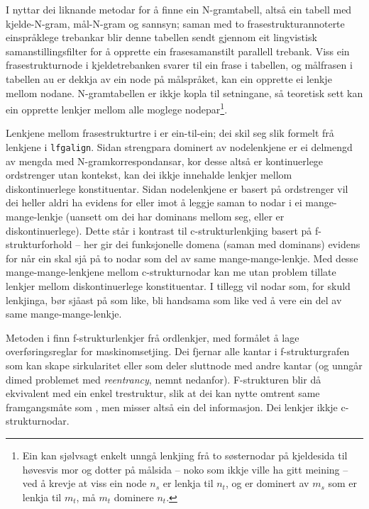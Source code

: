\documentclass[11pt,a4paper,oneside,draft]{book}
\begin{document}
 I \citet{samuelsson2007apa} nyttar dei liknande metodar for å finne
 ein N-gramtabell, altså ein tabell med kjelde-N-gram, mål-N-gram og
 sannsyn; saman med to frasestrukturannoterte einspråklege trebankar
 blir denne tabellen sendt gjennom eit lingvistisk
 samanstillingsfilter for å opprette ein frasesamanstilt parallell
 trebank. Viss ein frasestrukturnode i kjeldetrebanken svarer til ein
 frase i tabellen, og målfrasen i tabellen au er dekkja av ein node på
 målspråket, kan ein opprette ei lenkje mellom nodane.  N-gramtabellen
 er ikkje kopla til setningane, så teoretisk sett kan ein opprette
 lenkjer mellom alle moglege nodepar\footnote{Ein kan sjølvsagt enkelt unngå lenkjing frå to søsternodar på
        kjeldesida til høvesvis mor og dotter på målsida -- noko som
        ikkje ville ha gitt meining -- ved å krevje at viss ein node
        $n_s$ er lenkja til $n_t$, og er dominert av $m_s$ som er
        lenkja til $m_t$, må $m_t$ dominere $n_t$. }. 

 Lenkjene mellom frasestrukturtre i \citet{samuelsson2007apa} er
 ein-til-ein; dei skil seg slik formelt frå lenkjene i
 \texttt{lfgalign}. Sidan strengpara dominert av nodelenkjene er ei delmengd
 av mengda med N-gramkorrespondansar, kor desse altså er kontinuerlege
 ordstrenger utan kontekst, kan dei ikkje innehalde lenkjer mellom
 diskontinuerlege konstituentar. Sidan nodelenkjene er basert på
 ordstrenger vil dei heller aldri ha evidens for eller imot å leggje
 saman to nodar i ei mange-mange-lenkje (uansett om dei har dominans
 mellom seg, eller er diskontinuerlege). Dette står i kontrast til
 c-strukturlenkjing basert på f-strukturforhold -- her gir dei
 funksjonelle domena (saman med dominans) evidens for når ein skal sjå
 på to nodar som del av same mange-mange-lenkje.  Med desse
 mange-mange-lenkjene mellom c-strukturnodar kan me utan problem
 tillate lenkjer mellom diskontinuerlege konstituentar. I tillegg vil
 nodar som, for skuld lenkjinga, bør sjåast på som like, bli handsama
 som like ved å vere ein del av same mange-mange-lenkje.
 
 Metoden i \citet{graham2009osr} finn f-strukturlenkjer frå
 ordlenkjer, med formålet å lage overføringsreglar for
 maskinomsetjing. Dei fjernar alle kantar i f-strukturgrafen som kan
 skape sirkularitet eller som deler sluttnode med andre kantar (og
 unngår dimed problemet med \emph{reentrancy}, nemnt
 nedanfor). F-strukturen blir då ekvivalent med ein enkel trestruktur,
 slik at dei kan nytte omtrent same framgangsmåte som
 \citet{samuelsson2007apa}, men misser altså ein del informasjon. Dei
 lenkjer ikkje c-strukturnodar.
\end{document}
